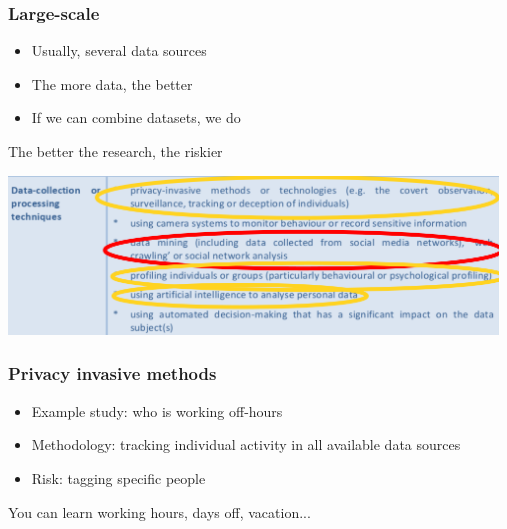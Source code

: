 \documentclass[17pt,aspectratio=169,hyperref={pdfusetitle,colorlinks,allcolors=olive}]{beamer}
\begin{document}
\begin{frame}[fragile]
  \frametitle{Large-scale}

  \begin{itemize}
  \item Usually, several data sources
  \item The more data, the better
  \item If we can combine datasets, we do
  \end{itemize}

  \begin{flushright}
    The better the research, the riskier
  \end{flushright}
\end{frame}

\begin{frame}[fragile]
  \vspace{-1.6cm}
  \begin{center}
    \includegraphics[width=13cm]{figs/gdpr-higher-risks-annotated-techniques}
  \end{center}
\end{frame}

\begin{frame}[fragile]
  \frametitle{Privacy invasive methods}

  \begin{itemize}
  \item Example study: who is working off-hours

  \item Methodology: tracking individual activity in all available data sources

  \item Risk: tagging specific people
  \end{itemize}
  
  \begin{flushright}
    You can learn working hours, days off, vacation...
  \end{flushright}
\end{frame}
\end{document}
